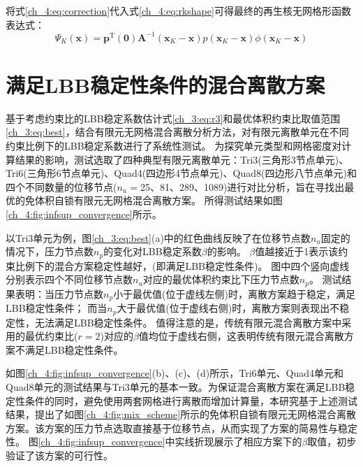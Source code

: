 将式\eqref{ch_4:eq:correction}代入式\eqref{ch_4:eq:rkshape}可得最终的再生核无网格形函数表达式：
\begin{equation}\label{ch_4:eq:mfshapefunction}
    \Psi_K(\boldsymbol x) = \boldsymbol p^{\mathrm{T}}(\boldsymbol 0) \boldsymbol A^{-1}(\boldsymbol x_K-\boldsymbol x)p(\boldsymbol x_K-\boldsymbol x)\phi(\boldsymbol x_K-\boldsymbol x)
\end{equation}

\section{满足LBB稳定性条件的混合离散方案}
基于考虑约束比的LBB稳定系数估计式\eqref{ch_3:eq:r3}和最优体积约束比取值范围\eqref{ch_3:eq:best}，结合有限元无网格混合离散分析方法，对有限元离散单元在不同约束比例下的LBB稳定系数进行了系统性测试。
为探究单元类型和网格密度对计算结果的影响，测试选取了四种典型有限元离散单元：Tri3(三角形3节点单元)、Tri6(三角形6节点单元)、Quad4(四边形4节点单元)、Quad8(四边形八节点单元)和四个不同数量的位移节点($n_u=$25、81、289、1089)进行对比分析，旨在寻找出最优的免体积自锁有限元无网格混合离散方案。
所得测试结果如图\ref{ch_4:fig:infsup_convergence}所示。

以Tri3单元为例，图\eqref{ch_3:eq:best}(a)中的红色曲线反映了在位移节点数$n_u$固定的情况下，压力节点数$n_p$的变化对LBB稳定系数$\beta$的影响。
$\beta$值越接近于1表示该约束比例下的混合方案稳定性越好，(即满足LBB稳定性条件)。
图中四个竖向虚线分别表示四个不同位移节点数$n_u$对应的最优体积约束比下压力节点数$n_p$。
测试结果表明：当压力节点数$n_p$小于最优值(位于虚线左侧)时，离散方案趋于稳定，满足LBB稳定性条件；
而当$n_p$大于最优值(位于虚线右侧)时，离散方案则表现出不稳定性，无法满足LBB稳定性条件。
值得注意的是，传统有限元混合离散方案中采用的最优约束比($r=2$)对应的$\beta$值均位于虚线右侧，这表明传统有限元混合离散方案不满足LBB稳定性条件。

如图\ref{ch_4:fig:infsup_convergence}(b)、(c)、(d)所示，Tri6单元、Quad4单元和Quad8单元的测试结果与Tri3单元的基本一致。为保证混合离散方案在满足LBB稳定性条件的同时，避免使用两套网格进行离散而增加计算量，本研究基于上述测试结果，提出了如图\ref{ch_4:fig:mix_scheme}所示的免体积自锁有限元无网格混合离散方案。该方案的压力节点选取直接基于位移节点，从而实现了方案的简易性与稳定性。
图\ref{ch_4:fig:infsup_convergence}中实线折现展示了相应方案下的$\beta$取值，初步验证了该方案的可行性。


